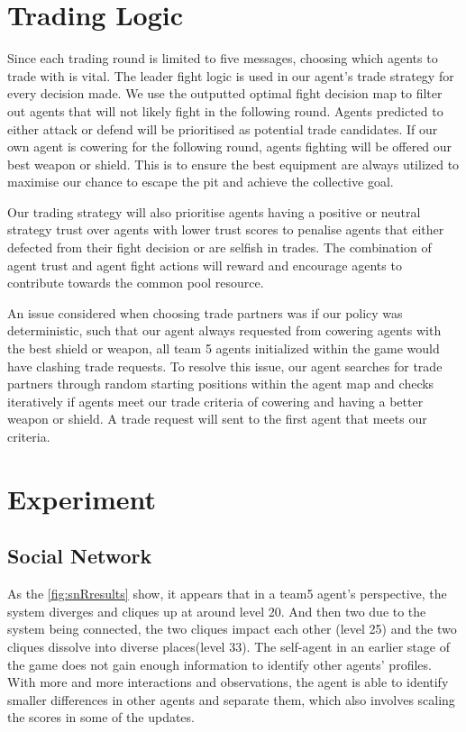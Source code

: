 \section{Trading Logic}

\noindent Since each trading round is limited to five messages, choosing which agents to trade with is vital. The leader fight logic is used in our agent’s trade strategy for every decision made. We use the outputted optimal fight decision map to filter out agents that will not likely fight in the following round. Agents predicted to either attack or defend will be prioritised as potential trade candidates. If our own agent is cowering for the following round, agents fighting will be offered our best weapon or shield. This is to ensure the best equipment are always utilized to maximise our chance to escape the pit and achieve the collective goal.

\noindent Our trading strategy will also prioritise agents having a positive or neutral strategy trust over agents with lower trust scores to penalise agents that either defected from their fight decision or are selfish in trades. The combination of agent trust and agent fight actions will reward and encourage agents to contribute towards the common pool resource.

\noindent An issue considered when choosing trade partners was if our policy was deterministic, such that our agent always requested from cowering agents with the best shield or weapon, all team 5 agents initialized within the game would have clashing trade requests. To resolve this issue, our agent searches for trade partners through random starting positions within the agent map and checks iteratively if agents meet our trade criteria of cowering and having a better weapon or shield. A trade request will sent to the first agent that meets our criteria.

\pagebreak{}
\section{Experiment}

\subsection{Social Network}

As the \ref{fig:snRresults} show, it appears that in a team5 agent's perspective, the system diverges and cliques up at around level 20. And then two due to the system being connected, the two cliques impact each other (level 25) and the two cliques dissolve into diverse places(level 33). The self-agent in an earlier stage of the game does not gain enough information to identify other agents' profiles. With more and more interactions and observations, the agent is able to identify smaller differences in other agents and separate them, which also involves scaling the scores in some of the updates.



